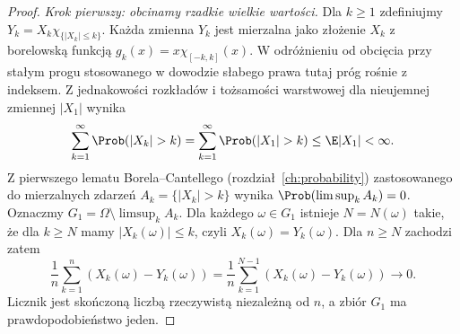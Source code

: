 \begin{proof}
\emph{Krok pierwszy: obcinamy rzadkie wielkie wartości.}
Dla $k\geq1$ zdefiniujmy
$Y_k=X_k\chi_{\{|X_k|\leq k\}}$.
Każda zmienna $Y_k$ jest mierzalna jako złożenie
$X_k$ z borelowską funkcją
$g_k(x)=x\chi_{[-k,k]}(x)$.
W odróżnieniu od obcięcia przy stałym progu stosowanego
w dowodzie słabego prawa tutaj próg rośnie z indeksem.
Z jednakowości rozkładów i tożsamości warstwowej
dla nieujemnej zmiennej $|X_1|$ wynika
\[
\sum_{k=1}^\infty\Prob(|X_k|>k)
=\sum_{k=1}^\infty\Prob(|X_1|>k)
\leq\E|X_1|<\infty.
\]
Z pierwszego lematu Borela--Cantellego
(rozdział~\ref{ch:probability}) zastosowanego do
mierzalnych zdarzeń $A_k=\{|X_k|>k\}$ wynika
$\Prob(\limsup_k A_k)=0$.
Oznaczmy $G_1=\Omega\setminus\limsup_k A_k$.
Dla każdego $\omega\in G_1$ istnieje $N=N(\omega)$
takie, że dla $k\geq N$ mamy $|X_k(\omega)|\leq k$,
czyli $X_k(\omega)=Y_k(\omega)$.
Dla $n\geq N$ zachodzi zatem
\[
\frac1n\sum_{k=1}^n(X_k(\omega)-Y_k(\omega))
=\frac1n\sum_{k=1}^{N-1}(X_k(\omega)-Y_k(\omega))
\longrightarrow0.
\]
Licznik jest skończoną liczbą rzeczywistą niezależną
od $n$, a zbiór $G_1$ ma prawdopodobieństwo jeden.


\end{proof}

